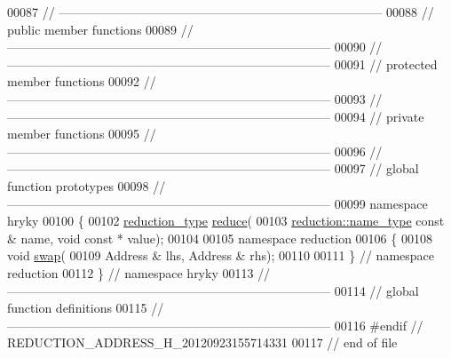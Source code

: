 \begin{DoxyCode}
00087 \textcolor{comment}{//
      ------------------------------------------------------------------------------}
00088 \textcolor{comment}{// public member functions}
00089 \textcolor{comment}{//
      ------------------------------------------------------------------------------}
00090 \textcolor{comment}{//
      ------------------------------------------------------------------------------}
00091 \textcolor{comment}{// protected member functions}
00092 \textcolor{comment}{//
      ------------------------------------------------------------------------------}
00093 \textcolor{comment}{//
      ------------------------------------------------------------------------------}
00094 \textcolor{comment}{// private member functions}
00095 \textcolor{comment}{//
      ------------------------------------------------------------------------------}
00096 \textcolor{comment}{//
      ------------------------------------------------------------------------------}
00097 \textcolor{comment}{// global function prototypes}
00098 \textcolor{comment}{//
      ------------------------------------------------------------------------------}
00099 \textcolor{keyword}{namespace }hryky
00100 \{
00102     \hyperlink{namespacehryky_a343a9a4c36a586be5c2693156200eadc}{reduction_type} \hyperlink{namespacehryky_af41cb3af6766761da0ff21b84527a52c}{reduce}(
00103         \hyperlink{namespacehryky_1_1reduction_ac686c30a4c8d196bbd0f05629a6b921f}{reduction::name_type} \textcolor{keyword}{const} & name, \textcolor{keywordtype}{void} \textcolor{keyword}{const} * value);
00104 
00105 \textcolor{keyword}{namespace }reduction
00106 \{
00108     \textcolor{keywordtype}{void} \hyperlink{namespacehryky_1_1reduction_a493c83efdf5f9e9c49ba77e1b65325a1}{swap}(
00109         Address & lhs, Address & rhs);
00110 
00111 \} \textcolor{comment}{// namespace reduction}
00112 \} \textcolor{comment}{// namespace hryky}
00113 \textcolor{comment}{//
      ------------------------------------------------------------------------------}
00114 \textcolor{comment}{// global function definitions}
00115 \textcolor{comment}{//
      ------------------------------------------------------------------------------}
00116 \textcolor{preprocessor}{#endif // REDUCTION\_ADDRESS\_H\_20120923155714331}
00117 \textcolor{preprocessor}{}\textcolor{comment}{// end of file}
\end{DoxyCode}
